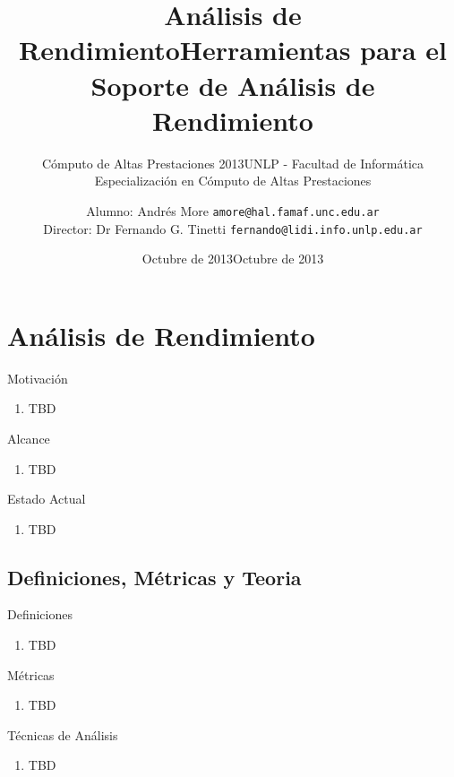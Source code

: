 \documentclass{beamer}
\title{Análisis de Rendimiento}
\subtitle{Cómputo de Altas Prestaciones 2013}
\title{Herramientas para el Soporte de An\'alisis de Rendimiento}
\subtitle{UNLP - Facultad de Inform\'atica \\
  Especializaci\'on en C\'omputo de Altas Prestaciones}
\date{Octubre de 2013}
\author{\footnotesize
  Alumno: Andr\'es More {\tt amore@hal.famaf.unc.edu.ar}\\
  Director: Dr Fernando G. Tinetti {\tt fernando@lidi.info.unlp.edu.ar}
}
\date{Octubre de 2013}
\begin{document}
\begin{frame}
  \titlepage
\end{frame}

\section{Análisis de Rendimiento}

\begin{frame}{Motivación}
	\begin{enumerate}
	\item TBD 
	\end{enumerate}
\end{frame}

\begin{frame}{Alcance}
	\begin{enumerate}
	\item TBD 
	\end{enumerate}
\end{frame}

\begin{frame}{Estado Actual}
	\begin{enumerate}
	\item TBD 
	\end{enumerate}
\end{frame}

\subsection{Definiciones, Métricas y Teoria}

\begin{frame}{Definiciones}
	\begin{enumerate}
	\item TBD 
	\end{enumerate}
\end{frame}

\begin{frame}{Métricas}
	\begin{enumerate}
	\item TBD 
	\end{enumerate}
\end{frame}

\begin{frame}{Técnicas de Análisis}
	\begin{enumerate}
	\item TBD 
	\end{enumerate}
\end{frame}
\end{document}
